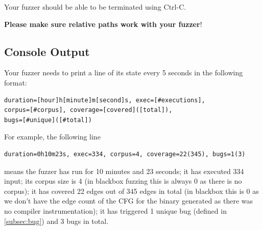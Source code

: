 \documentclass[letterpaper,11pt]{article}
\begin{document}
Your fuzzer should be able to be terminated using Ctrl-C.

\textbf{Please make sure relative paths work with your fuzzer}!

\subsection{Console Output}

Your fuzzer needs to print a line of its state every 5 seconds in the following format:

\begin{verbatim}
duration=[hour]h[minute]m[second]s, exec=[#executions],
corpus=[#corpus], coverage=[covered]([total]),
bugs=[#unique]([#total])
\end{verbatim}

For example, the following line

\begin{verbatim}
duration=0h10m23s, exec=334, corpus=4, coverage=22(345), bugs=1(3)
\end{verbatim}

means the fuzzer has run for 10 minutes and 23 seconds; it has executed 334 input; its corpus size is 4 (in blackbox fuzzing this is always 0 as there is no corpus); it has covered 22 edges out of 345 edges in total (in blackbox this is 0 as we don't have the edge count of the CFG for the binary generated as there was no compiler instrumentation); it has triggered 1 unique bug (defined in \autoref{subsec:bug}) and 3 bugs in total.



\end{document}
